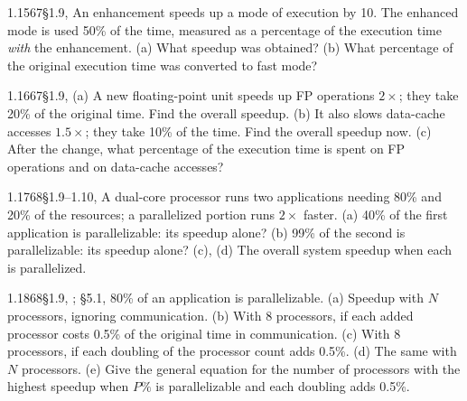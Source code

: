 \begin{tbexercise}{1.15}{67}{\S1.9, }
An enhancement speeds up a mode of execution by 10. The enhanced mode is used 50\%
of the time, measured as a percentage of the execution time \emph{with} the
enhancement. (a) What speedup was obtained? (b) What percentage of the original
execution time was converted to fast mode?
\end{tbexercise}

\begin{tbexercise}{1.16}{67}{\S1.9, }
(a) A new floating-point unit speeds up FP operations $2\times$; they take 20\% of the
original time. Find the overall speedup. (b) It also slows data-cache accesses
$1.5\times$; they take 10\% of the time. Find the overall speedup now. (c) After the
change, what percentage of the execution time is spent on FP operations and on
data-cache accesses?
\end{tbexercise}

\begin{tbexercise}{1.17}{68}{\S1.9--1.10, }
A dual-core processor runs two applications needing 80\% and 20\% of the resources;
a parallelized portion runs $2\times$ faster. (a) 40\% of the first application is
parallelizable: its speedup alone? (b) 99\% of the second is parallelizable: its
speedup alone? (c), (d) The overall system speedup when each is parallelized.
\end{tbexercise}

\begin{tbexercise}{1.18}{68}{\S1.9, ; \S5.1, }
80\% of an application is parallelizable. (a) Speedup with $N$ processors, ignoring
communication. (b) With 8 processors, if each added processor costs 0.5\% of the
original time in communication. (c) With 8 processors, if each doubling of the
processor count adds 0.5\%. (d) The same with $N$ processors. (e) Give the general
equation for the number of processors with the highest speedup when $P\%$ is
parallelizable and each doubling adds 0.5\%.
\end{tbexercise}

